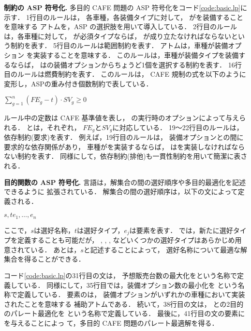 \textbf{制約の ASP 符号化.}
多目的 CAFE 問題の ASP 符号化をコード\ref{code:basic.lp}に示す．
%
1行目のルールは，
各車種，各装備タイプに対して，
がを装備することを意味する
アトムを，ASP の選択肢を用いて導入している．
%
2行目のルールは，各車種に対して，
が必須タイプならば，
が成り立たなければならないという制約を表す．
%
5行目のルールは範囲制約を表す．
アトムは，車種が装備オプション
を実装することを意味する．
このルールは，車種が装備タイプを装備するならば，
はの装備オプションからちょうど1個を選択する制約を表す．
%
16行目のルールは燃費制約を表す．
このルールは，
CAFE 規制の式を以下のように変形し，ASPの重み付き個数制約で表している．
\begin{center}
\(\sum_{g=1}^{n} (FE_{g}-t)\cdot SV_{g} \geq 0\)  
\end{center}
ルール中の定数は CAFE 基準値を表し，
{\asprin}の実行時のオプションによって与えられる．
とは，それぞれ，
$FE_{g}$と$SV_{g}$に対応している．
%
19〜22行目のルールは，依存制約(要求)を表す．
例えば，19行目のルールは，
装備オプションとの間に要求的な依存関係があり，
車種がを実装するならば，
はを実装しなければならない制約を表す．
同様にして，依存制約(排他)も一貫性制約を用いて簡潔に表される．

\textbf{目的関数の ASP 符号化.}
{\asprin}言語は，解集合の間の選好順序や多目的最適化を記述できるように
拡張されている．
解集合の間の選好順序は，以下の文によって定義される．
\begin{center}
  $s,t$\code{)\{}$e_1,\dots,e_n$
\end{center}
ここで，$s$は選好名称，$t$は選好タイプ，$e_j$は要素を表す．
{\asprin} では，新たに選好タイプを定義することも可能だが，
, 
,
,
などいくつかの選好タイプはあらかじめ用意されている．
あとは，$s$\code{)}と記述することによって，
選好名称について最適な解集合を得ることができる．

コード\ref{code:basic.lp}の31行目の文は，
予想販売台数の最大化をという名称で定義している．
同様にして，35行目では，装備オプション数の最小化を
という名称で定義している．
要素のは，
装備オプションがいずれかの車種において実装されたことを意味する
補助アトムである．
続いて，38行目の文は，
との2目的のパレート最適化を
という名称で定義している．
最後に，41行目の文の要素にを与えることによっ
て，多目的 CAFE 問題のパレート最適解を得る．

